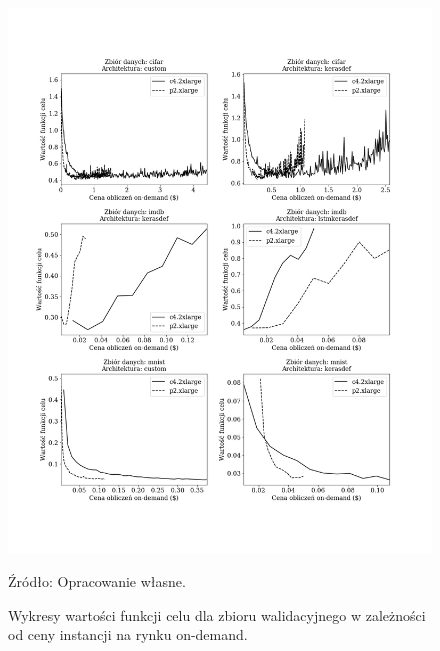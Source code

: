 \documentclass[12pt,a4paper,twoside]{article}
\newcommand{\source}[1]{\caption*{\hfill Źródło: {#1}} }
\begin{document}
\begin{figure}[h]
  \centering
\includegraphics[scale=0.5]{../obrazy/fig:experiment_loss_val_price_ond.png}
\caption{Wykresy wartości funkcji celu dla zbioru walidacyjnego w zależności od ceny instancji na rynku on-demand.\label{fig:experiment_loss_val_price_ond}}
\source{Opracowanie własne.}
\end{figure}
\end{document}
